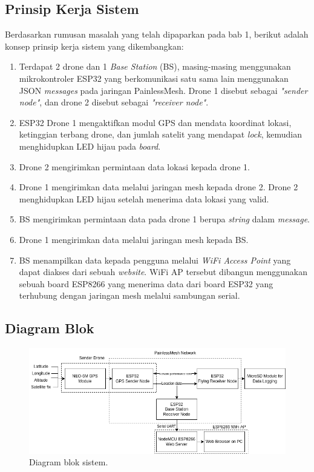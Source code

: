 \subsection{Prinsip Kerja Sistem}
Berdasarkan rumusan masalah yang telah dipaparkan pada bab 1, berikut adalah konsep prinsip kerja sistem yang dikembangkan:
\begin{enumerate}
	\item Terdapat 2 drone dan 1 \textit{Base Station} (BS), masing-masing menggunakan mikrokontroler ESP32 yang berkomunikasi satu sama lain menggunakan JSON \textit{messages} pada jaringan PainlessMesh. Drone 1 disebut sebagai \textit{"sender node"}, dan drone 2 disebut sebagai \textit{"receiver node"}.
	\item ESP32 Drone 1 mengaktifkan modul GPS dan mendata koordinat lokasi, ketinggian terbang drone, dan jumlah satelit yang mendapat \textit{lock}, kemudian menghidupkan LED hijau pada \textit{board}.
	\item Drone 2 mengirimkan permintaan data lokasi kepada drone 1.
	\item Drone 1 mengirimkan data melalui jaringan mesh kepada drone 2. Drone 2 menghidupkan LED hijau setelah menerima data lokasi yang valid.
	\item BS mengirimkan permintaan data pada drone 1 berupa \textit{string} dalam \textit{message}.
	\item Drone 1 mengirimkan data melalui jaringan mesh kepada BS.
	\item BS menampilkan data kepada pengguna melalui \textit{WiFi Access Point} yang dapat diakses dari sebuah \textit{website}. WiFi AP tersebut dibangun menggunakan sebuah board ESP8266 yang menerima data dari board ESP32 yang terhubung dengan jaringan mesh melalui sambungan serial.
\end{enumerate}

\subsection{Diagram Blok}
\begin{figure}[H]
	\centering
	\includegraphics[scale=0.5]{./assets/DiagramBlokTANew}
	\caption{Diagram blok sistem.}
\end{figure}

